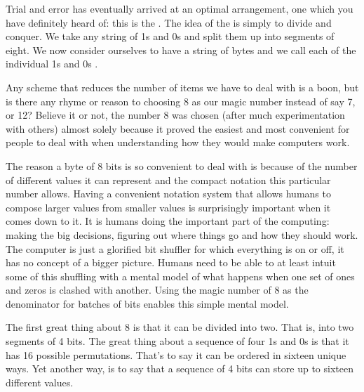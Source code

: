 Trial and error has eventually arrived at an optimal arrangement, one which
you have definitely heard of: this is the . The idea of the 
is simply to divide and conquer. We take any string of 1s and 0s and split
them up into segments of eight. We now consider ourselves to have a string
of bytes and we call each of the individual 1s and 0s . 

Any scheme that reduces the number of items we have to deal with is a boon,
but is there any rhyme or reason to choosing 8 as our magic number instead
of say 7, or 12? Believe it or not, the number 8 was chosen 
(after much experimentation with others) almost solely because it proved the easiest and
most convenient for people to deal with when understanding how they would
make computers work.

The reason a byte of 8 bits is so convenient to deal with is because of
the number of different values it can represent and the compact notation
this particular number allows. Having a convenient notation system that
allows humans to compose larger values from smaller values is surprisingly
important when it comes down to it. It is humans doing the important part
of the computing: making the big decisions, figuring out where things go
and how they should work. The computer is just a glorified bit shuffler
for which everything is on or off, it has no concept of a bigger picture. Humans
need to be able to at least intuit some of this shuffling with a mental
model of what happens when one set of ones and zeros is clashed with another.
Using the magic number of 8 as the denominator for batches of bits enables
this simple mental model.

The first great thing about 8 is that it can be divided into two. That is,
into two segments of 4 bits. The great thing about a sequence of four 1s
and 0s is that it has 16 possible permutations. That's to say it can be
ordered in sixteen unique ways. Yet another way, is to say that a sequence
of 4 bits can store up to sixteen different values.

